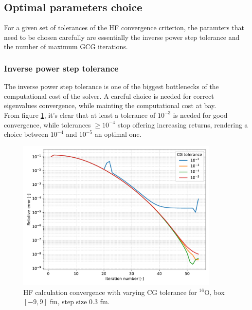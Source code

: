 \subsection{Optimal parameters choice}
For a given set of tolerances of the HF convergence criterion, the paramters that need to be chosen carefully are essentially the inverse power step tolerance and the number of maximum GCG iterations.
\subsubsection{Inverse power step tolerance}
The inverse power step tolerance is one of the biggest bottlenecks of the computational cost of the solver. A careful choice is needed for correct eigenvalues convergence, while mainting the computational cost at bay.
\\From figure \ref{fig:conv_tol}, it's clear that at least a tolerance of $10^{-3}$ is needed for good convergence, while tolerances $\ge 10^{-4}$ stop offering increasing returns, rendering a choice between $10^{-4}$ and $10^{-5}$ an optimal one.
\begin{figure}[H]
    \centering
    \includegraphics[width=0.9\textwidth]{Images/conv_tol.pdf}
    \caption{HF calculation convergence with varying CG tolerance for $^{16}$O, box $[-9, 9]$ fm, step size $0.3$ fm.} 
    \label{fig:conv_tol}
\end{figure}
